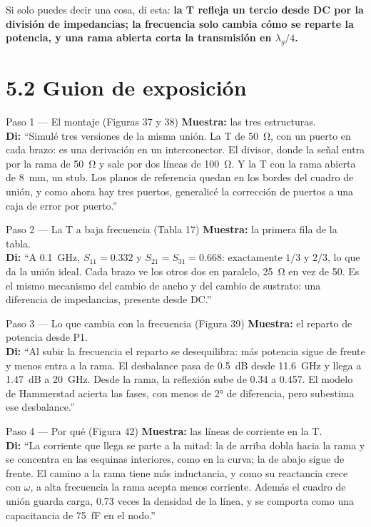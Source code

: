 \documentclass[11pt,letterpaper]{article}
\begin{document}
Si solo puedes decir una cosa, di esta: \textbf{la T refleja un tercio desde DC por la división de impedancias; la frecuencia solo cambia cómo se reparte la potencia, y una rama abierta corta la transmisión en $\lambda_g/4$.}

\section*{5.2 Guion de exposición}

\begin{paso}{Paso 1 --- El montaje (Figuras 37 y 38)}
\textbf{Muestra:} las tres estructuras.\\
\textbf{Di:} ``Simulé tres versiones de la misma unión. La T de \SI{50}{\ohm}, con un puerto en cada brazo: es una derivación en un interconector. El divisor, donde la señal entra por la rama de \SI{50}{\ohm} y sale por dos líneas de \SI{100}{\ohm}. Y la T con la rama abierta de \SI{8}{mm}, un stub. Los planos de referencia quedan en los bordes del cuadro de unión, y como ahora hay tres puertos, generalicé la corrección de puertos a una caja de error por puerto.''
\end{paso}

\begin{paso}{Paso 2 --- La T a baja frecuencia (Tabla 17)}
\textbf{Muestra:} la primera fila de la tabla.\\
\textbf{Di:} ``A \SI{0.1}{GHz}, $S_{11}=0.332$ y $S_{21}=S_{31}=0.668$: exactamente $1/3$ y $2/3$, lo que da la unión ideal. Cada brazo ve los otros dos en paralelo, \SI{25}{\ohm} en vez de 50. Es el mismo mecanismo del cambio de ancho y del cambio de sustrato: una diferencia de impedancias, presente desde DC.''
\end{paso}

\begin{paso}{Paso 3 --- Lo que cambia con la frecuencia (Figura 39)}
\textbf{Muestra:} el reparto de potencia desde P1.\\
\textbf{Di:} ``Al subir la frecuencia el reparto se desequilibra: más potencia sigue de frente y menos entra a la rama. El desbalance pasa de \SI{0.5}{dB} desde \SI{11.6}{GHz} y llega a \SI{1.47}{dB} a \SI{20}{GHz}. Desde la rama, la reflexión sube de 0.34 a 0.457. El modelo de Hammerstad acierta las fases, con menos de \ang{2} de diferencia, pero subestima ese desbalance.''
\end{paso}

\begin{paso}{Paso 4 --- Por qué (Figura 42)}
\textbf{Muestra:} las líneas de corriente en la T.\\
\textbf{Di:} ``La corriente que llega se parte a la mitad: la de arriba dobla hacia la rama y se concentra en las esquinas interiores, como en la curva; la de abajo sigue de frente. El camino a la rama tiene más inductancia, y como su reactancia crece con $\omega$, a alta frecuencia la rama acepta menos corriente. Además el cuadro de unión guarda carga, 0.73 veces la densidad de la línea, y se comporta como una capacitancia de \SI{75}{fF} en el nodo.''
\end{paso}
\end{document}
